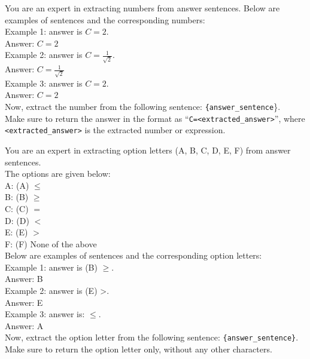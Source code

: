 \begin{textcolorbox}

You are an expert in extracting numbers from answer sentences. 
Below are examples of sentences and the corresponding numbers:\\

Example 1: answer is $C=2$. \\
Answer: $C=2$ \\

Example 2: answer is $C = \frac{1}{\sqrt{2}}$. \\
Answer: $C = \frac{1}{\sqrt{2}}$ \\

Example 3: answer is $\boxed{C=2}$.\\
Answer: $C=2$ \\

Now, extract the number from the following sentence:
\texttt{\{answer\_sentence}\}. \\

Make sure to return the answer in the format as ``\texttt{C=<extracted\_answer>}'', where \texttt{<extracted\_answer>} is the extracted number or expression.
\end{textcolorbox}


\begin{textcolorbox}
You are an expert in extracting option letters (A, B, C, D, E, F) from answer sentences. \\

The options are given below:\\
A: (A) $\leq$ \\
B: (B) $\geq$ \\
C: (C) $=$ \\
D: (D) $<$\\
E: (E) $>$\\
F: (F) None of the above\\

Below are examples of sentences and the corresponding option letters:\\

Example 1: answer is (B) $\geq$. \\
Answer: B\\

Example 2: answer is (E) >. \\
Answer: E\\

Example 3: answer is: $\boxed{\leq}$. \\
Answer: A\\

Now, extract the option letter from the following sentence: \texttt{\{answer\_sentence\}}. \\

Make sure to return the option letter only, without any other characters.
\end{textcolorbox}
